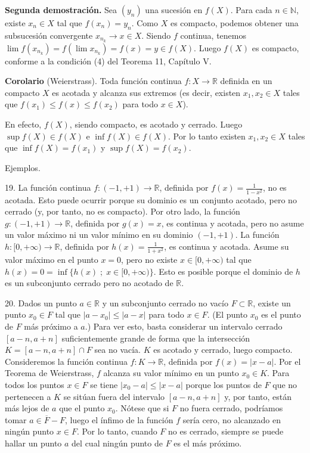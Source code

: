 \documentclass[12pt,oneside]{book}
\begin{document}
\textbf{Segunda demostración.} Sea \((y_n)\) una sucesión en \(f(X)\). Para cada \(n \in \mathbb{N}\), existe \(x_n \in X\) tal que \(f(x_n) = y_n\). Como \(X\) es compacto, podemos obtener una subsucesión convergente \(x_{n_k} \to x \in X\). Siendo \(f\) continua, tenemos \(\lim f(x_{n_k}) = f(\lim x_{n_k}) = f(x) = y \in f(X)\). Luego \(f(X)\) es compacto, conforme a la condición (4) del Teorema 11, Capítulo V.

\textbf{Corolario} (Weierstrass). Toda función continua \(f: X \to \mathbb{R}\) definida en un compacto \(X\) es acotada y alcanza sus extremos (es decir, existen \(x_1, x_2 \in X\) tales que \(f(x_1) \leq f(x) \leq f(x_2)\) para todo \(x \in X\)).

En efecto, \(f(X)\), siendo compacto, es acotado y cerrado. Luego \(\sup f(X) \in f(X)\) e \(\inf f(X) \in f(X)\). Por lo tanto existen \(x_1, x_2 \in X\) tales que \(\inf f(X) = f(x_1)\) y \(\sup f(X) = f(x_2)\).

Ejemplos.

19. La función continua \(f: (-1, +1) \to \mathbb{R}\), definida por \(f(x) = \frac{1}{1 - x^2}\), no es acotada. Esto puede ocurrir porque su dominio es un conjunto acotado, pero no cerrado (y, por tanto, no es compacto). Por otro lado, la función \(g: (-1, +1) \to \mathbb{R}\), definida por \(g(x) = x\), es continua y acotada, pero no asume un valor máximo ni un valor mínimo en su dominio \((-1, +1)\). La función \(h: [0, +\infty) \to \mathbb{R}\), definida por \(h(x) = \frac{1}{1 + x^2}\), es continua y acotada. Asume su valor máximo en el punto \(x = 0\), pero no existe \(x \in [0, +\infty)\) tal que \(h(x) = 0 = \inf\{h(x) \; ; \; x \in [0, +\infty)\}\). Esto es posible porque el dominio de \(h\) es un subconjunto cerrado pero no acotado de \(\mathbb{R}\).

20. Dados un punto \(a \in \mathbb{R}\) y un subconjunto cerrado no vacío \(F \subset \mathbb{R}\), existe un punto \(x_0 \in F\) tal que \(|a - x_0| \leq |a - x|\) para todo \(x \in F\). (El punto \(x_0\) es el punto de \(F\) más próximo a \(a\).) Para ver esto, basta considerar un intervalo cerrado \([a - n, a + n]\) suficientemente grande de forma que la intersección \(K = [a - n, a + n] \cap F\) sea no vacía. \(K\) es acotado y cerrado, luego compacto. Consideremos la función continua \(f: K \to \mathbb{R}\), definida por \(f(x) = |x - a|\). Por el Teorema de Weierstrass, \(f\) alcanza su valor mínimo en un punto \(x_0 \in K\). Para todos los puntos \(x \in F\) se tiene \(|x_0 - a| \leq |x - a|\) porque los puntos de \(F\) que no pertenecen a \(K\) se sitúan fuera del intervalo \([a - n, a + n]\) y, por tanto, están más lejos de \(a\) que el punto \(x_0\). Nótese que si \(F\) no fuera cerrado, podríamos tomar \(a \in \overline{F} - F\), luego el ínfimo de la función \(f\) sería cero, no alcanzado en ningún punto \(x \in F\). Por lo tanto, cuando \(F\) no es cerrado, siempre se puede hallar un punto \(a\) del cual ningún punto de \(F\) es el más próximo.
\end{document}
